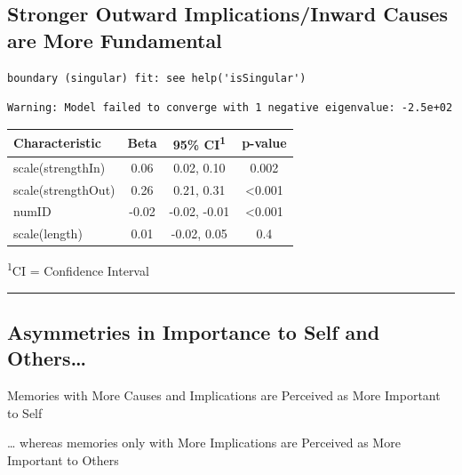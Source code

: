 \documentclass[
  .7em,
  letterpaper,
  DIV=11,
  numbers=noendperiod]{scrartcl}
\begin{document}
\hypertarget{stronger-outward-implicationsinward-causes-are-more-fundamental}{%
\subsection{Stronger Outward Implications/Inward Causes are More
Fundamental}\label{stronger-outward-implicationsinward-causes-are-more-fundamental}}

\begin{verbatim}
boundary (singular) fit: see help('isSingular')
\end{verbatim}

\begin{verbatim}
Warning: Model failed to converge with 1 negative eigenvalue: -2.5e+02
\end{verbatim}

\captionsetup[table]{labelformat=empty,skip=1pt}
\setlength{\LTpost}{0mm}
\begin{longtable}{lccc}
\toprule
\textbf{Characteristic} & \textbf{Beta} & \textbf{95\% CI}\textsuperscript{1} & \textbf{p-value} \\ 
\midrule
scale(strengthIn) & 0.06 & 0.02, 0.10 & 0.002 \\ 
scale(strengthOut) & 0.26 & 0.21, 0.31 & <0.001 \\ 
numID & -0.02 & -0.02, -0.01 & <0.001 \\ 
scale(length) & 0.01 & -0.02, 0.05 & 0.4 \\ 
\bottomrule
\end{longtable}
\begin{minipage}{\linewidth}
\textsuperscript{1}CI = Confidence Interval\\
\end{minipage}

\begin{center}\rule{0.5\linewidth}{0.5pt}\end{center}

\hypertarget{asymmetries-in-importance-to-self-and-others}{%
\subsection{Asymmetries in Importance to Self and
Others\ldots{}}\label{asymmetries-in-importance-to-self-and-others}}

Memories with More Causes and Implications are Perceived as More
Important to Self

\ldots{} whereas memories only with More Implications are Perceived as
More Important to Others
\end{document}
